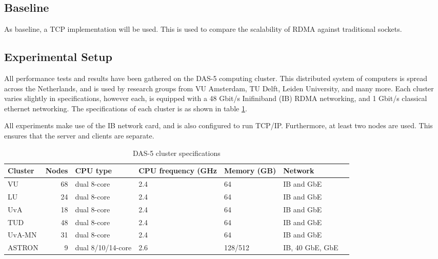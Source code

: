 \subsection{Baseline}
As baseline, a TCP implementation will be used.
This is used to compare the scalability of RDMA against traditional sockets.


\subsection{Experimental Setup}
All performance tests and results have been gathered on the DAS-5 computing cluster.
This distributed system of computers is spread across the Netherlands, and is used by research groups from VU Amsterdam, TU Delft, Leiden University, and many more.
Each cluster varies slightly in specifications, however each, is equipped with a 48 Gbit/s Inifiniband (IB) RDMA networking, and 1 Gbit/s classical ethernet networking.
The specifications of each cluster is as shown in table \ref{tab:das5}.

All experiments make use of the IB network card, and is also configured to run TCP/IP.
Furthermore, at least two nodes are used.
This ensures that the server and clients are separate.

\begin{table}
    \centering
    \begin{tabular}{lrlllll}
        \toprule
        \textbf{Cluster} & \textbf{Nodes} & \textbf{CPU type} & \textbf{CPU frequency (GHz} & \textbf{Memory (GB)} & \textbf{Network} \\
        \midrule
        VU & 68 & dual 8-core & 2.4 & 64 & IB and GbE \\
        LU & 24 & dual 8-core & 2.4 & 64 & IB and GbE \\
        UvA & 18 & dual 8-core & 2.4 & 64 & IB and GbE \\
        TUD & 48 & dual 8-core & 2.4 & 64 & IB and GbE \\
        UvA-MN & 31 & dual 8-core & 2.4 & 64 & IB and GbE \\
        ASTRON & 9 & dual 8/10/14-core & 2.6 & 128/512 & IB, 40 GbE, GbE \\
        \bottomrule
    \end{tabular}
    \caption{DAS-5 cluster specifications}
    \label{tab:das5}
\end{table}






